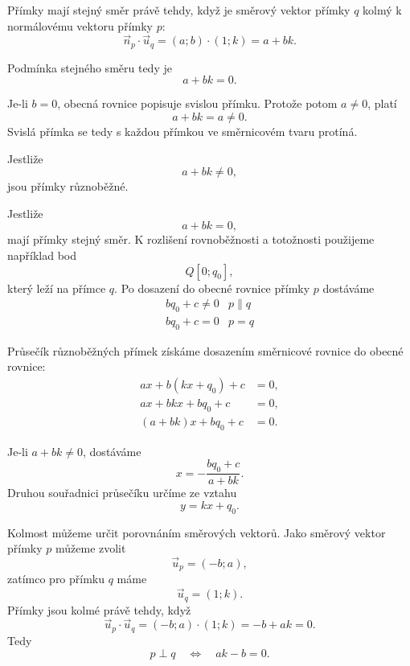 Přímky mají stejný směr právě tehdy, když je směrový vektor přímky
$q$ kolmý k normálovému vektoru přímky $p$:
\[
    \vec{n}_p\cdot\vec{u}_q
    =
    (a;b)\cdot(1;k)
    =
    a+bk.
\]

Podmínka stejného směru tedy je
\begin{equation}\label{eq:Mixed_general_slope_parallel_condition}
    a+bk=0.
\end{equation}

Je-li $b=0$, obecná rovnice popisuje svislou přímku. Protože potom
$a\neq0$, platí
\[
    a+bk=a\neq0.
\]
Svislá přímka se tedy s každou přímkou ve směrnicovém tvaru protíná.

Jestliže
\[
    a+bk\neq0,
\]
jsou přímky různoběžné.

Jestliže
\[
    a+bk=0,
\]
mají přímky stejný směr. K rozlišení rovnoběžnosti a totožnosti
použijeme například bod
\[
    Q[0;q_0],
\]
který leží na přímce $q$. Po dosazení do obecné rovnice přímky $p$
dostáváme
\[
\begin{array}{c|c}
    bq_0+c\neq0
    &
    p\parallel q
    \\[1mm]
    bq_0+c=0
    &
    p=q
\end{array}
\]

Průsečík různoběžných přímek získáme dosazením směrnicové rovnice do
obecné rovnice:
\begin{align*}
    ax+b(kx+q_0)+c&=0,\\
    ax+bkx+bq_0+c&=0,\\
    (a+bk)x+bq_0+c&=0.
\end{align*}

Je-li $a+bk\neq0$, dostáváme
\begin{equation}\label{eq:Mixed_general_slope_intersection_x}
    x
    =
    -\frac{bq_0+c}{a+bk}.
\end{equation}
Druhou souřadnici průsečíku určíme ze vztahu
\[
    y=kx+q_0.
\]

Kolmost můžeme určit porovnáním směrových vektorů. Jako směrový vektor
přímky $p$ můžeme zvolit
\[
    \vec{u}_p=(-b;a),
\]
zatímco pro přímku $q$ máme
\[
    \vec{u}_q=(1;k).
\]
Přímky jsou kolmé právě tehdy, když
\[
    \vec{u}_p\cdot\vec{u}_q
    =
    (-b;a)\cdot(1;k)
    =
    -b+ak
    =
    0.
\]
Tedy
\begin{equation}\label{eq:Mixed_general_slope_perpendicular_condition}
    p\perp q
    \quad\Longleftrightarrow\quad
    ak-b=0.
\end{equation}

